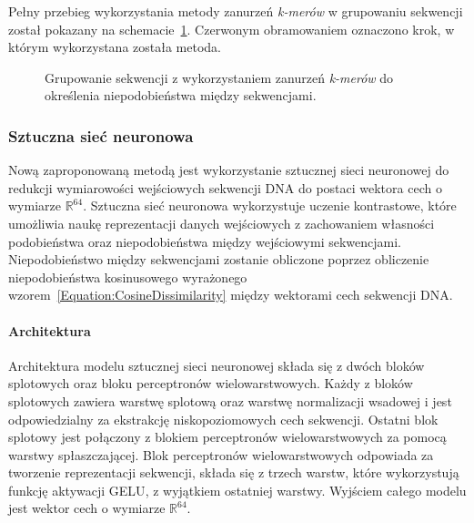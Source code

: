             Pełny przebieg wykorzystania metody zanurzeń \textit{k-merów} w grupowaniu sekwencji został pokazany na schemacie~\ref{Picture:Cluster:KMer}. Czerwonym obramowaniem oznaczono krok, w którym wykorzystana została metoda.

            \begin{figure}
                \begin{center}
                    
                \end{center}
                \caption{
                    Grupowanie sekwencji z wykorzystaniem zanurzeń \textit{k-merów} do określenia niepodobieństwa między sekwencjami.
                }\label{Picture:Cluster:KMer}
            \end{figure}

        \subsubsection{Sztuczna sieć neuronowa}

            Nową zaproponowaną metodą jest wykorzystanie sztucznej sieci neuronowej do redukcji wymiarowości wejściowych sekwencji DNA do postaci wektora cech o wymiarze $\mathbb{R}^{64}$. Sztuczna sieć neuronowa wykorzystuje uczenie kontrastowe, które umożliwia naukę reprezentacji danych wejściowych z zachowaniem własności podobieństwa oraz niepodobieństwa między wejściowymi sekwencjami. Niepodobieństwo między sekwencjami zostanie obliczone poprzez obliczenie niepodobieństwa kosinusowego wyrażonego wzorem~\eqref{Equation:CosineDissimilarity} między wektorami cech sekwencji DNA.

            \paragraph{Architektura}
                Architektura modelu sztucznej sieci neuronowej składa się z dwóch bloków splotowych oraz bloku perceptronów wielowarstwowych. Każdy z bloków splotowych zawiera warstwę splotową oraz warstwę normalizacji wsadowej i jest odpowiedzialny za ekstrakcję niskopoziomowych cech sekwencji. Ostatni blok splotowy jest połączony z blokiem perceptronów wielowarstwowych za pomocą warstwy spłaszczającej. Blok perceptronów wielowarstwowych odpowiada za tworzenie reprezentacji sekwencji, składa się z trzech warstw, które wykorzystują funkcję aktywacji GELU\cite{Hendrycks:2016}, z wyjątkiem ostatniej warstwy. Wyjściem całego modelu jest wektor cech o wymiarze $\mathbb{R}^{64}$.

